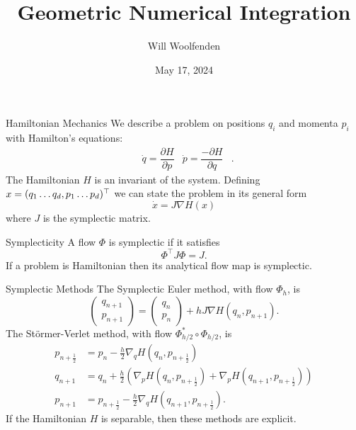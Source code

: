 \documentclass[aspectratio=169]{beamer}
\title{Geometric Numerical Integration}
\author{Will Woolfenden}
\date{May 17, 2024}
\begin{document}
\maketitle

\begin{frame}{Hamiltonian Mechanics}
	We describe a problem on positions $q_i$ and momenta $p_i$ with Hamilton's equations: \pause
	\begin{align*}
		&\dot{q} = \dfrac{\partial H}{\partial p}
		&
		\dot{p} = \dfrac{-\partial H}{\partial q}&.	
	\end{align*} \pause
	The Hamiltonian $H$ is an invariant of the system. \pause
	Defining $x = (q_1 \mathellipsis q_d, p_1 \mathellipsis p_d)^\top$ we can state the problem in its general form
	\begin{equation*}
		\dot{x} = J \nabla H(x)
	\end{equation*}
	where $J$ is the symplectic matrix.
\end{frame}

\begin{frame}{Symplecticity}
	A flow $\Phi$ is symplectic if it satisfies
	\begin{equation*}
		\Phi^\top J \Phi = J.
	\end{equation*}
	If a problem is Hamiltonian then its analytical flow map is symplectic.
\end{frame}

\begin{frame}{Symplectic Methods} \pause
	The Symplectic Euler method, with flow $\Phi_h$, is
	\begin{equation*}
		\begin{pmatrix}
			q_{n+1} \\
			p_{n+1} 
		\end{pmatrix} = \begin{pmatrix}
			q_{n} \\
			p_{n}
		\end{pmatrix} + h J \nabla H(q_{n}, p_{n+1}).
	\end{equation*} \pause
	The St\"ormer-Verlet method, with flow $\Phi_{h/2}^* \circ \Phi_{h/2}$, is
	\begin{align*}
		p_{n+\frac{1}{2}} &= p_n - \frac{h}{2}\nabla_q H \left( q_n, p_{n+\frac{1}{2}} \right) \\
		q_{n+1} &= q_n + \frac{h}{2}\left( \nabla_p H \left( q_n, p_{n+\frac{1}{2}} \right) + \nabla_p H \left(q_{n+1}, p_{n+\frac{1}{2}} \right) \right) \\
		p_{n+1} &= p_{n+\frac{1}{2}} - \frac{h}{2} \nabla_q H \left( q_{n+1}, p_{n+\frac{1}{2}} \right).
	\end{align*} \pause
	If the Hamiltonian $H$ is separable, then these methods are explicit.
\end{frame}
\end{document}
